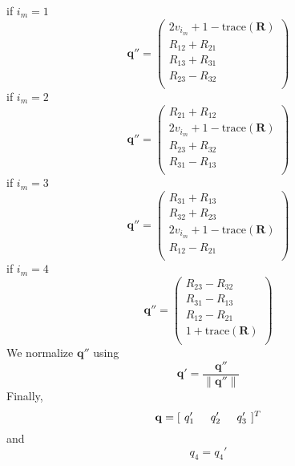 \noindent if $i_m = 1$
%
\begin{equation}
     \mathbf{q}''  = \begin{pmatrix}
     2v_{i_m} + 1 - \mbox{trace}(\mathbf{R})\\
     R_{12} + R_{21}\\
     R_{13} + R_{31}\\
     R_{23} - R_{32}\\
     \end{pmatrix}
\end{equation}
%
if $i_m = 2$
%
\begin{equation}
     \mathbf{q}''  = \begin{pmatrix}
     R_{21} + R_{12}\\
     2v_{i_m} + 1 - \mbox{trace}(\mathbf{R})\\
     R_{23} + R_{32}\\
     R_{31} - R_{13}\\
     \end{pmatrix}
\end{equation}
%
if $i_m = 3$
%
\begin{equation}
     \mathbf{q}''  = \begin{pmatrix}
     R_{31} + R_{13}\\
     R_{32} + R_{23}\\
     2v_{i_m} + 1 - \mbox{trace}(\mathbf{R})\\
     R_{12} - R_{21}\\
     \end{pmatrix}
\end{equation}
%
if $i_m = 4$
%
\begin{equation}
     \mathbf{q}''  = \begin{pmatrix}
     R_{23} - R_{32}\\
     R_{31} - R_{13}\\
     R_{12} - R_{21}\\
     1 + \mbox{trace}(\mathbf{R})\\
     \end{pmatrix}
\end{equation}
%
We normalize $\mathbf{q}''$ using
%
\begin{equation}
    \mathbf{q}' = \frac{\mathbf{q}''}{\| \mathbf{q}'' \|}
\end{equation}
%
Finally,
%
\begin{equation}
   \mathbf{q} = [\hspace{.05 in} q_{1}' \hspace{.2 in} q_{2}' \hspace{.2 in} q_3'
   \hspace{.05 in}]^T
\end{equation}
%
and
%
\begin{equation}
     q_4 = q_4'
\end{equation}

